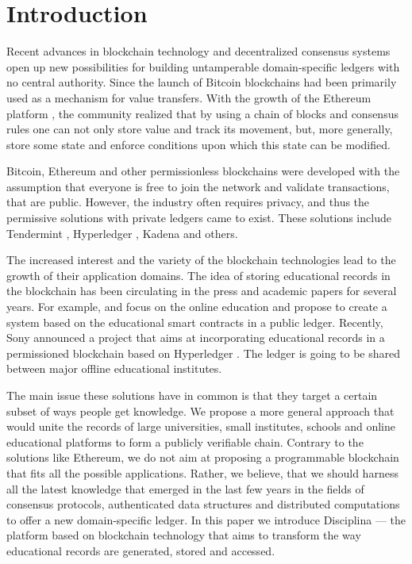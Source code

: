 \section{Introduction}
Recent advances in blockchain technology and decentralized consensus systems open up new possibilities for building untamperable domain-specific ledgers with no central authority. Since the launch of Bitcoin \cite{nakamoto2008bitcoin} blockchains had been primarily used as a mechanism for value transfers. With the growth of the Ethereum platform \cite{wood2014ethereum}, the community realized that by using a chain of blocks and consensus rules one can not only store value and track its movement, but, more generally, store some state and enforce conditions upon which this state can be modified.

Bitcoin, Ethereum and other permissionless blockchains were developed with the assumption that everyone is free to join the network and validate transactions, that are public. However, the industry often requires privacy, and thus the permissive solutions with private ledgers came to exist. These solutions include Tendermint \cite{kwon2014tendermint}, Hyperledger \cite{cachin2016architecture}, Kadena \cite{Kadena} and others.

The increased interest and the variety of the blockchain technologies lead to the growth of their application domains. The idea of storing educational records in the blockchain has been circulating in the press and academic papers for several years. For example, \cite{swan2015blockchain} and \cite{devine2015blockchain} focus on the online education and propose to create a system based on the educational smart contracts in a public ledger. Recently, Sony announced a project that aims at incorporating educational records in a permissioned blockchain based on Hyperledger \cite{SGE}. The ledger is going to be shared between major offline educational institutes.

The main issue these solutions have in common is that they target a certain subset of ways people get knowledge. We propose a more general approach that would unite the records of large universities, small institutes, schools and online educational platforms to form a publicly verifiable chain. Contrary to the solutions like Ethereum, we do not aim at proposing a programmable blockchain that fits all the possible applications. Rather, we believe, that we should harness all the latest knowledge that emerged in the last few years in the fields of consensus protocols, authenticated data structures and distributed computations to offer a new domain-specific ledger. In this paper we introduce Disciplina — the platform based on blockchain technology that aims to transform the way educational records are generated, stored and accessed.
